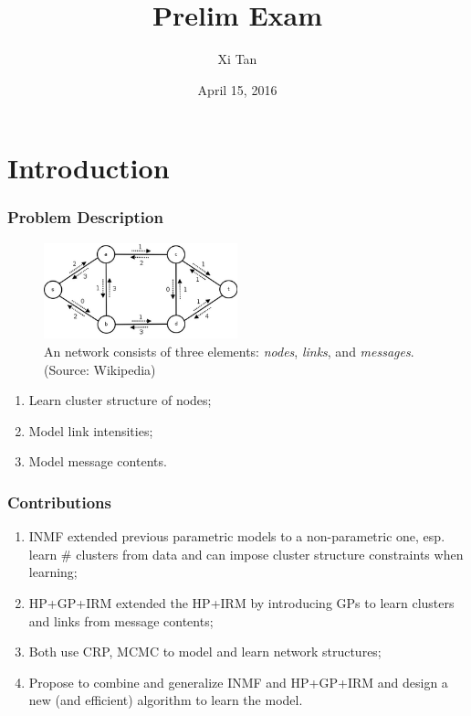 \documentclass{beamer}
\begin{document}
\title{Prelim Exam}
\author{Xi Tan}
\date{April 15, 2016}
\maketitle

\section{Introduction}
\begin{frame}
\frametitle{Problem Description}
\begin{figure}[c]
  \includegraphics[width=0.5\textwidth]{figures/Network.png}
  \caption{An network consists of three elements: {\em{nodes}}, {\em{links}}, and {\em{messages}}. (Source: Wikipedia)}
\end{figure}

\begin{enumerate}
	\item Learn cluster structure of nodes;
    \item Model link intensities; 
    \item Model message contents.
\end{enumerate}

\end{frame}

\begin{frame}
\frametitle{Contributions}
\begin{enumerate}
	\item INMF extended previous parametric models to a non-parametric one, esp. learn \# clusters from data and can impose cluster structure constraints when learning;
    \item HP+GP+IRM extended the HP+IRM by introducing GPs to learn clusters and links from message contents;
    \item Both use CRP, MCMC to model and learn network structures;
    \item Propose to combine and generalize INMF and HP+GP+IRM and design a new (and efficient) algorithm to learn the model.
\end{enumerate}

\end{frame}
\end{document}
